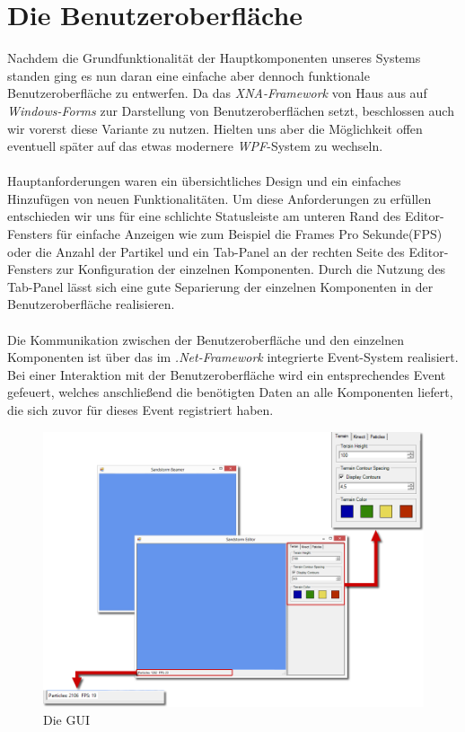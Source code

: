 \section{Die Benutzeroberfläche}
\begin{Spacing}{\mylinespace}

Nachdem die Grundfunktionalität der Hauptkomponenten unseres Systems standen ging es nun daran eine einfache aber dennoch funktionale Benutzeroberfläche zu entwerfen. Da das \textit{XNA-Framework} von Haus aus auf \textit{Windows-Forms} zur Darstellung von Benutzeroberflächen setzt, beschlossen auch wir vorerst diese Variante zu nutzen. Hielten uns aber die Möglichkeit offen eventuell später auf das etwas modernere \textit{WPF}-System zu wechseln.
\\\\
Hauptanforderungen waren ein übersichtliches Design und ein einfaches Hinzufügen von neuen Funktionalitäten. Um diese Anforderungen zu erfüllen entschieden wir uns für eine schlichte Statusleiste am unteren Rand des Editor-Fensters für einfache Anzeigen wie zum Beispiel die Frames Pro Sekunde(FPS) oder die Anzahl der Partikel und ein Tab-Panel an der rechten Seite des Editor-Fensters zur Konfiguration der einzelnen Komponenten. Durch die Nutzung des Tab-Panel lässt sich eine gute Separierung der einzelnen Komponenten in der Benutzeroberfläche realisieren. 
\\\\
Die Kommunikation zwischen der Benutzeroberfläche und den einzelnen Komponenten ist über das im \textit{.Net-Framework} integrierte Event-System realisiert. Bei einer Interaktion mit der Benutzeroberfläche wird ein entsprechendes Event gefeuert, welches anschließend die benötigten Daten an alle Komponenten liefert, die sich zuvor für dieses Event registriert haben.  

\begin{figure}[h!]
	\vspace*{30px}
	\includegraphics[width=\columnwidth]{graphics/gui.png}	
	\caption{Die GUI}
	\label{fig:GUI}
\end{figure}

\end{Spacing}
\newpage
\clearpage
